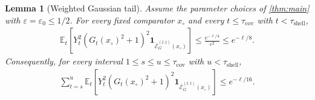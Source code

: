 \documentclass{article}
\newtheorem{lemma}[lemma]{Lemma}
\newcommand{\E}{\mathbb E}
\newcommand{\1}{\mathbf 1}
\newcommand{\eps}{\varepsilon}
\begin{document}
\begin{lemma}[Weighted Gaussian tail]
    \label{lem:weighted-gaussian-tail}
    Assume the parameter choices of \cref{thm:main} with $\eps=\eps_0\leq1/2$.
    For every fixed comparator $x_{\circ}$ and every
    $t\leq\tau_{\mathrm{cov}}$ with $t<\tau_{\mathrm{shell}}$,
    \begin{align}
        \E_t\left[Y_t^2(G_t(x_{\circ})^2+1)^2
        \1_{\overline{\mathcal E}_G^{(t:t)}(x_{\circ})}\right]
        \leq\frac{e^{-\ell/4}}{\eps^2}
        \leq e^{-\ell/8}.
    \end{align}
    Consequently, for every interval
    $1\leq s\leq u\leq\tau_{\mathrm{cov}}$ with $u<\tau_{\mathrm{shell}}$,
    \begin{align}
        \sum_{t=s}^{u}\E_t\left[Y_t^2(G_t(x_{\circ})^2+1)^2
        \1_{\overline{\mathcal E}_G^{(t:t)}(x_{\circ})}\right]
        \leq e^{-\ell/16}.
    \end{align}
\end{lemma}
\end{document}
